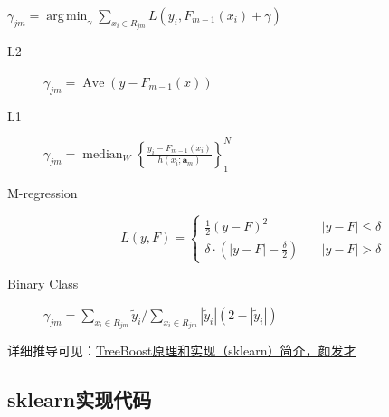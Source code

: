 \begin{frame}
    $\gamma_{jm} = \operatorname{arg \, min}_{\gamma} \sum_{x_i \in R_{jm}} L(y_i, F_{m-1}(x_i) + \gamma)$

    \vfill

    \begin{description}
        \item [L2] $\gamma_{jm} = \operatorname{Ave} (y - F_{m-1}(x))$
        \item [L1] $\gamma_{jm} = \operatorname{median}_W \left \{ \frac{y_i - F_{m-1}(x_i)}{h(x_i; \mathbf{a}_m)} \right \}_1^N$
        \item [M-regression] \begin{equation*} L(y, F) = \begin{cases}
                                    \frac{1}{2} (y - F)^2 \quad & |y - F| \leq \delta \\
                                    \delta \cdot \left (\big |y - F \big | - \frac{\delta}{2} \right ) \quad & |y - F| > \delta
                                \end{cases}
                            \end{equation*}
        \item [Binary Class] $\gamma_{jm} = \sum_{x_i \in R_{jm}} \tilde{y}_i \Big / \sum_{x_i \in R_{jm}} |\tilde{y}_i| (2 - |\tilde{y}_i|)$
    \end{description}
    {\tiny
    详细推导可见：\href{http://nbviewer.jupyter.org/github/facaiy/book_notes/blob/master/machine_learning/tree/gbdt/treeboost/intro.ipynb}{TreeBoost原理和实现（sklearn）简介，颜发才}}
\end{frame}


\subsection{sklearn实现代码}

